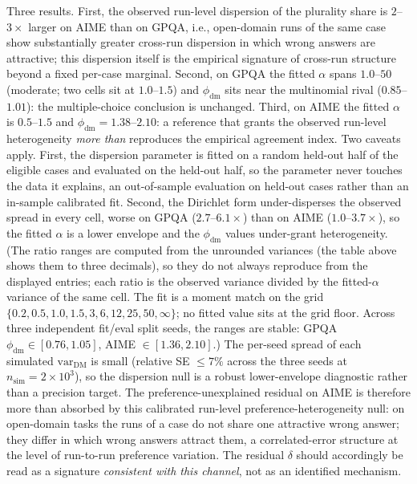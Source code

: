\documentclass[a4paper,fleqn]{cas-sc}
\begin{document}
Three results. First, the observed run-level dispersion of the plurality
share is $2$--$3\times$ larger on AIME than on GPQA, i.e., open-domain
runs of the same case show substantially greater cross-run dispersion in which wrong answers are
attractive; this dispersion itself is the empirical signature of
cross-run structure beyond a fixed per-case marginal. Second, on GPQA
the fitted $\alpha$ spans $1.0$--$50$ (moderate; two cells sit at $1.0$--$1.5$) and
$\phi_{\mathrm{dm}}$ sits near the multinomial rival
($0.85$--$1.01$): the multiple-choice conclusion is unchanged. Third,
on AIME the fitted $\alpha$ is $0.5$--$1.5$ and
$\phi_{\mathrm{dm}}=1.38$--$2.10$: a reference that grants the observed
run-level heterogeneity \emph{more than} reproduces the empirical
agreement index. Two caveats apply. First, the dispersion
parameter is fitted on a random held-out half of the eligible cases and
evaluated on the held-out half, so the parameter never touches the data
it explains, an out-of-sample evaluation on held-out cases rather than an in-sample calibrated fit.
Second, the Dirichlet form under-disperses the observed spread in every cell, worse on GPQA ($2.7$--$6.1\times$) than on AIME ($1.0$--$3.7\times$), so the fitted $\alpha$ is a lower envelope and the $\phi_{\mathrm{dm}}$ values under-grant heterogeneity. (The ratio ranges are computed from the unrounded variances (the table above shows them to three decimals), so they do not always reproduce from the displayed entries; each ratio is the observed variance divided by the fitted-$\alpha$ variance of the same cell. The fit is a moment match on the grid $\{0.2,0.5,1.0,1.5,3,6,12,25,50,\infty\}$; no fitted value sits at the grid floor. Across three independent fit/eval split seeds, the ranges are stable: GPQA $\phi_{\mathrm{dm}}\in[0.76,1.05]$, AIME $\in[1.36,2.10]$.) The per-seed spread of each simulated $\mathrm{var}_{\mathrm{DM}}$ is small (relative SE $\le7\%$ across the three seeds at $n_{\mathrm{sim}}=2\times10^3$), so the dispersion null is a robust lower-envelope diagnostic rather than a precision target.
The preference-unexplained
residual on AIME is therefore more than absorbed by this calibrated
run-level preference-heterogeneity null: on open-domain tasks the runs of a case do
not share one attractive wrong answer; they differ in which wrong
answers attract them, a correlated-error structure at the level of
run-to-run preference variation. The residual $\delta$ should
accordingly be read as a signature \emph{consistent with this channel},
not as an identified mechanism.
\end{document}
